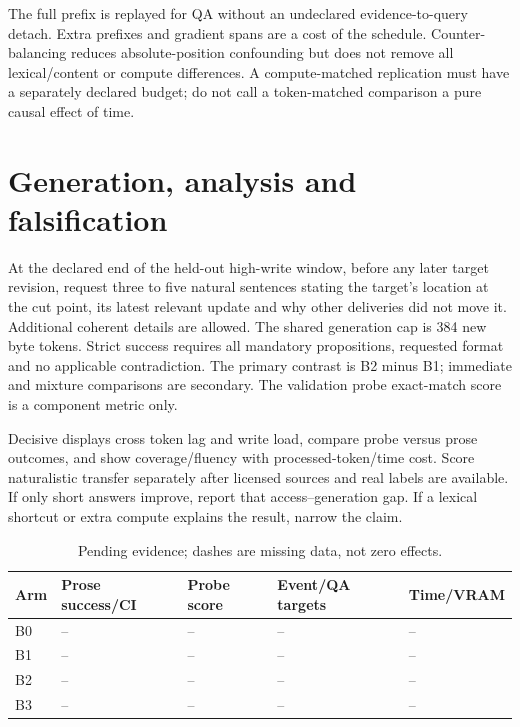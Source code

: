 \documentclass[11pt,a4paper]{article}
\begin{document}
The full prefix is replayed for QA without an undeclared evidence-to-query
detach. Extra prefixes and gradient spans are a cost of the schedule. Counter-
balancing reduces absolute-position confounding but does not remove all
lexical/content or compute differences. A compute-matched replication must
have a separately declared budget; do not call a token-matched comparison a
pure causal effect of time.



\section{Generation, analysis and falsification}
At the declared end of the held-out high-write window, before any later target revision, request three to five natural sentences
stating the target's location at the cut point, its latest relevant update and
why other deliveries did not move it. Additional coherent details are allowed.
The shared generation cap is 384 new byte tokens. Strict success requires all
mandatory propositions, requested format and no applicable contradiction.
The primary contrast is B2 minus B1; immediate and mixture comparisons are
secondary. The validation probe exact-match score is a component metric only.

Decisive displays cross token lag and write load, compare probe versus prose
outcomes, and show coverage/fluency with processed-token/time cost. Score
naturalistic transfer separately after licensed sources and real labels are
available. If only short answers improve, report that access--generation gap.
If a lexical shortcut or extra compute explains the result, narrow the claim.

\begin{table}[ht]\centering\small
\caption{Pending evidence; dashes are missing data, not zero effects.}
\begin{tabularx}{\linewidth}{lYYYY}\toprule
Arm & Prose success/CI & Probe score & Event/QA targets & Time/VRAM\\\midrule
B0 & -- & -- & -- & --\\B1 & -- & -- & -- & --\\
B2 & -- & -- & -- & --\\B3 & -- & -- & -- & --\\
\bottomrule\end{tabularx}\end{table}
\end{document}
